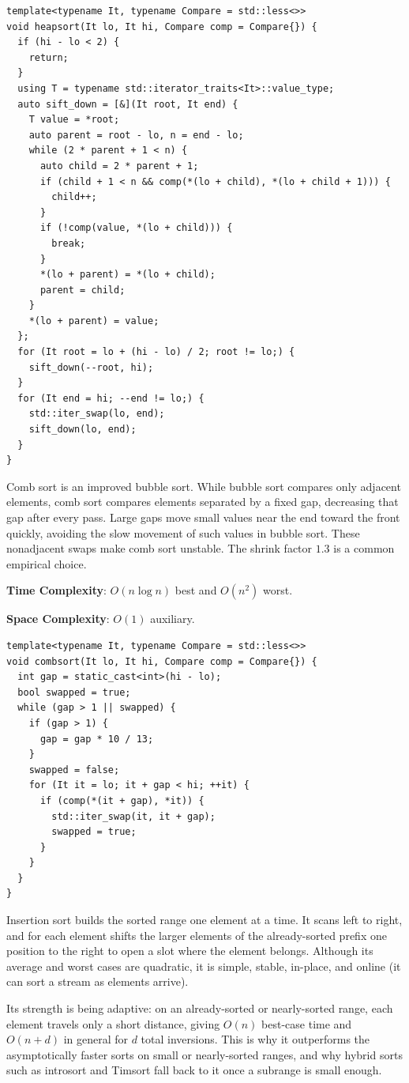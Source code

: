 \begin{lstlisting}[style=cpp]
template<typename It, typename Compare = std::less<>>
void heapsort(It lo, It hi, Compare comp = Compare{}) {
  if (hi - lo < 2) {
    return;
  }
  using T = typename std::iterator_traits<It>::value_type;
  auto sift_down = [&](It root, It end) {
    T value = *root;
    auto parent = root - lo, n = end - lo;
    while (2 * parent + 1 < n) {
      auto child = 2 * parent + 1;
      if (child + 1 < n && comp(*(lo + child), *(lo + child + 1))) {
        child++;
      }
      if (!comp(value, *(lo + child))) {
        break;
      }
      *(lo + parent) = *(lo + child);
      parent = child;
    }
    *(lo + parent) = value;
  };
  for (It root = lo + (hi - lo) / 2; root != lo;) {
    sift_down(--root, hi);
  }
  for (It end = hi; --end != lo;) {
    std::iter_swap(lo, end);
    sift_down(lo, end);
  }
}
\end{lstlisting}
Comb sort is an improved bubble sort. While bubble sort compares only adjacent elements, comb sort compares elements separated by a fixed gap, decreasing that gap after every pass. Large gaps move small values near the end toward the front quickly, avoiding the slow movement of such values in bubble sort. These nonadjacent swaps make comb sort unstable. The shrink factor $1.3$ is a common empirical choice.

\textbf{Time Complexity}: $O(n \log n)$ best and $O(n^{2})$ worst.

\textbf{Space Complexity}: $O(1)$ auxiliary.

\begin{lstlisting}[style=cpp]
template<typename It, typename Compare = std::less<>>
void combsort(It lo, It hi, Compare comp = Compare{}) {
  int gap = static_cast<int>(hi - lo);
  bool swapped = true;
  while (gap > 1 || swapped) {
    if (gap > 1) {
      gap = gap * 10 / 13;
    }
    swapped = false;
    for (It it = lo; it + gap < hi; ++it) {
      if (comp(*(it + gap), *it)) {
        std::iter_swap(it, it + gap);
        swapped = true;
      }
    }
  }
}
\end{lstlisting}
Insertion sort builds the sorted range one element at a time. It scans left to right, and for each element shifts the larger elements of the already-sorted prefix one position to the right to open a slot where the element belongs. Although its average and worst cases are quadratic, it is simple, stable, in-place, and online (it can sort a stream as elements arrive).

Its strength is being adaptive: on an already-sorted or nearly-sorted range, each element travels only a short distance, giving $O(n)$ best-case time and $O(n + d)$ in general for $d$ total inversions. This is why it outperforms the asymptotically faster sorts on small or nearly-sorted ranges, and why hybrid sorts such as introsort and Timsort fall back to it once a subrange is small enough.

